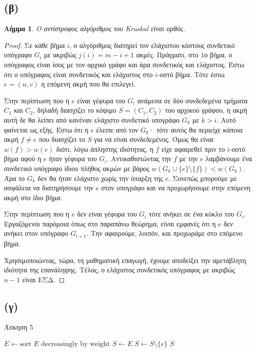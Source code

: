\documentclass[11pt,a4paper,oneside]{report}
\newtheorem*{lemma}{Λήμμα}
\begin{document}
\subsection*{(β)}
\begin{lemma}
Ο αντίστροφος αλγόριθμος του \textlatin{Kruskal} είναι ορθός.
\end{lemma}

\begin{proof}
Σε κάθε βήμα $i$, ο αλγόριθμος διατηρεί τον ελάχιστου κόστους συνδετικό υπόγραφο $G_i$ με ακριβώς $j(i) = m - i + 1$ ακμές. Πράγματι, στο $1$ο βήμα, ο υπόγραφος είναι ίσος με τον αρχικό γράφο και άρα συνδετικός και ελάχιστος. Έστω ότι ο υπόγραφος είναι συνδετικός και ελάχιστος στο $i$-οστό βήμα. Τότε έστω $e = (u, v)$ η επόμενη ακμή που θα επιλεγεί.

Στην περίπτωση που η $e$ είναι γέφυρα του $G_i$ ανάμεσα σε δύο συνδεδεμένα τμήματα $C_1$ και $C_2$, δηλαδή διασχίζει το κόψιμο $S = ( C_1, C_2 )$ του αρχικού γράφου, η ακμή αυτή δε θα λείπει από κανέναν ελάχιστο συνδετικό υπογράφο $G_k$ με $k > i$. Αυτό φαίνεται ως εξής. Έστω ότι η $e$ έλειπε από τον $G_k$· τότε αυτός θα περιείχε κάποια ακμή $f \neq e$ που διασχίζει το $S$ για να είναι συνδεδεμένος. Όμως θα είναι $w(f) > w(e)$ διότι, λόγω άπληστης ιδιότητας, η $f$ είχε αφαιρεθεί πριν το $i$-οστό βήμα αφού η $e$ ήταν γέφυρα του $G_i$. Αντικαθιστώντας την $f$ με την $e$ λαμβάνουμε ένα συνδετικό υπόγραφο ίδιου πλήθος ακμών με βάρος $w( G_k \cup \{ e \} \setminus \{ f \} ) < w( G_k )$. Άρα το $G_k$ δεν θα ήταν ελάχιστο χωρίς την ύπαρξη της $e$. Συνεπώς μπορούμε με ασφάλεια να διατηρήσουμε την $e$ στον υπογράφο και να προχωρήσουμε στην επόμενη ακμή στο ίδιο βήμα.

Στην περίπτωση που η $e$ δεν είναι γέφυρα του $G_i$ τότε ανήκει σε ένα κύκλο του $G_i$. Εργαζόμενοι παρόμοια όπως στο παραπάνω θεώρημα, είναι εμφανές ότι η $e$ δεν ανήκει στον υπόγραφο $G_{i+1}$. Την αφαιρούμε, λοιπόν, και προχωράμε στο επόμενο βήμα.

Χρησιμοποιώντας, τώρα, τη μαθηματική επαγωγή, έχουμε αποδείξει την αμετάβλητη ιδιότητα της επανάληψης. Τέλος, ο ελάχιστος συνδετικός υπόγραφος με ακριβώς $n - 1$ είναι ΕΣΔ.
\end{proof}

\subsection*{(γ)}

\begin{algorithm}[H]
\caption{\textgreek{Άσκηση 5}}
\begin{algorithmic}[1]

	\State $E \gets \text{sort } E \text{ decreasingly by weight}$
	\State $S \gets E$
			\State $S \gets S \setminus \{ e \}$
		\EndIf
	\EndFor
	\State \Return $S$
\EndProcedure
\end{algorithmic}
\end{algorithm}
\end{document}
